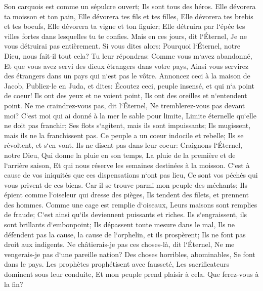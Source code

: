 \verse Son carquois est comme un sépulcre ouvert; Ils sont tous des héros. 
\verse Elle dévorera ta moisson et ton pain, Elle dévorera tes fils et tes filles, Elle dévorera tes brebis et tes boeufs, Elle dévorera ta vigne et ton figuier; Elle détruira par l`épée tes villes fortes dans lesquelles tu te confies. 
\verse Mais en ces jours, dit l`Éternel, Je ne vous détruirai pas entièrement. 
\verse Si vous dites alors: Pourquoi l`Éternel, notre Dieu, nous fait-il tout cela? Tu leur répondras: Comme vous m`avez abandonné, Et que vous avez servi des dieux étrangers dans votre pays, Ainsi vous servirez des étrangers dans un pays qui n`est pas le vôtre. 
\verse Annoncez ceci à la maison de Jacob, Publiez-le en Juda, et dites: 
\verse Écoutez ceci, peuple insensé, et qui n`a point de coeur! Ils ont des yeux et ne voient point, Ils ont des oreilles et n`entendent point. 
\verse Ne me craindrez-vous pas, dit l`Éternel, Ne tremblerez-vous pas devant moi? C`est moi qui ai donné à la mer le sable pour limite, Limite éternelle qu`elle ne doit pas franchir; Ses flots s`agitent, mais ils sont impuissants; Ils mugissent, mais ils ne la franchissent pas. 
\verse Ce peuple a un coeur indocile et rebelle; Ils se révoltent, et s`en vont. 
\verse Ils ne disent pas dans leur coeur: Craignons l`Éternel, notre Dieu, Qui donne la pluie en son temps, La pluie de la première et de l`arrière saison, Et qui nous réserve les semaines destinées à la moisson. 
\verse C`est à cause de vos iniquités que ces dispensations n`ont pas lieu, Ce sont vos péchés qui vous privent de ces biens. 
\verse Car il se trouve parmi mon peuple des méchants; Ils épient comme l`oiseleur qui dresse des pièges, Ils tendent des filets, et prennent des hommes. 
\verse Comme une cage est remplie d`oiseaux, Leurs maisons sont remplies de fraude; C`est ainsi qu`ils deviennent puissants et riches. 
\verse Ils s`engraissent, ils sont brillants d`embonpoint; Ils dépassent toute mesure dans le mal, Ils ne défendent pas la cause, la cause de l`orphelin, et ils prospèrent; Ils ne font pas droit aux indigents. 
\verse Ne châtierais-je pas ces choses-là, dit l`Éternel, Ne me vengerais-je pas d`une pareille nation? 
\verse Des choses horribles, abominables, Se font dans le pays. 
\verse Les prophètes prophétisent avec fausseté, Les sacrificateurs dominent sous leur conduite, Et mon peuple prend plaisir à cela. Que ferez-vous à la fin? 

